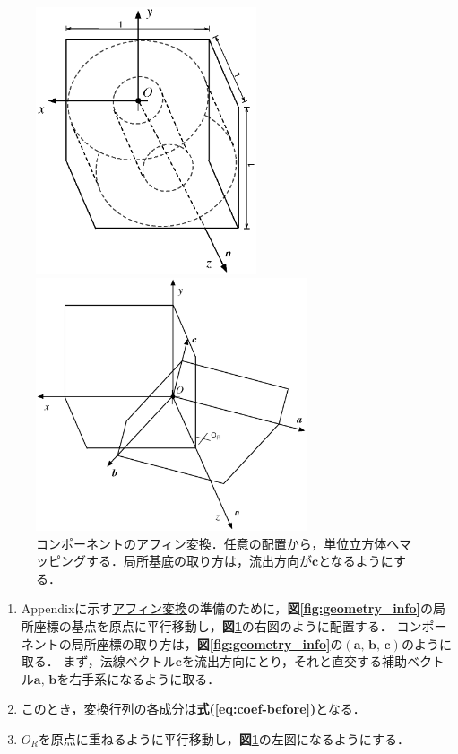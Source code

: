 \begin{figure}[htdp]
\begin{minipage}{0.45\hsize}
\begin{center}
\includegraphics[width=6.5cm,clip]{compo_trnsfm.eps}
\end{center}
\end{minipage}
\begin{minipage}{0.5\hsize}
\begin{center}
\includegraphics[width=8cm,clip]{Transform.eps}
\end{center}
\end{minipage}
\caption{コンポーネントのアフィン変換．任意の配置から，単位立方体へマッピングする．局所基底の取り方は，流出方向が$\bm c$となるようにする．}
\label{fig:compo transform}
\end{figure}

\begin{enumerate}
\item Appendixに示す\hyperlink{tgt:affin}{アフィン変換}の準備のために，\textbf{図\ref{fig:geometry_info}}の局所座標の基点を原点に平行移動し，\textbf{図\ref{fig:compo transform}}の右図のように配置する．
コンポーネントの局所座標の取り方は，\textbf{図\ref{fig:geometry_info}}の$(\bm a,\, \bm b,\, \bm c)$のように取る．
まず，法線ベクトル$\bm c$を流出方向にとり，それと直交する補助ベクトル$\bm a,\, \bm b$を右手系になるように取る．
\item このとき，変換行列の各成分は\textbf{式(\ref{eq:coef-before})}となる．
\item $O_R$を原点に重ねるように平行移動し，\textbf{図\ref{fig:compo transform}}の左図になるようにする．
\end{enumerate}


